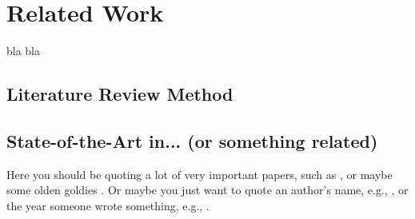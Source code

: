 \chapter{Related Work}
\label{cha:related_work}

\glsresetall

bla bla

\section{Literature Review Method}



\section{State-of-the-Art in...  (or something related)}
\label{sec:state_of_the_art}

Here you should be quoting a lot of very important papers, such as \citet{SelmerEA:13},
or maybe some olden goldies \citep{Bar-Hillel:60}.
Or maybe you just want to quote an author's name, e.g., \citeauthor{Harris:54},
or the year someone wrote something, e.g., \citeyear{Tesniere:59}.